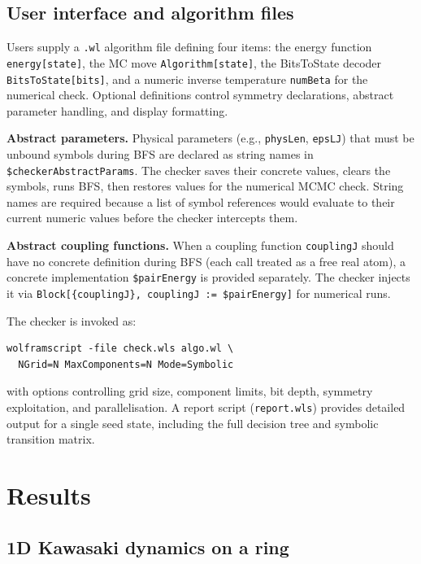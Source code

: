 \documentclass[twocolumn,10pt]{article}
\begin{document}
\subsection{User interface and algorithm files}
\label{sec:interface}

Users supply a \texttt{.wl} algorithm file defining four items: the energy
function \texttt{energy[state]}, the MC move \texttt{Algorithm[state]}, the
BitsToState decoder \texttt{BitsToState[bits]}, and a numeric inverse
temperature \texttt{numBeta} for the numerical check.  Optional definitions
control symmetry declarations, abstract parameter handling, and display
formatting.

\medskip\noindent\textbf{Abstract parameters.}
Physical parameters (e.g., \texttt{physLen}, \texttt{epsLJ}) that must be
unbound symbols during BFS are declared as string names in
\texttt{\$checkerAbstractParams}.  The checker saves their concrete values,
clears the symbols, runs BFS, then restores values for the numerical MCMC
check.  String names are required because a list of symbol references would
evaluate to their current numeric values before the checker intercepts them.

\medskip\noindent\textbf{Abstract coupling functions.}
When a coupling function \texttt{couplingJ} should have no concrete
definition during BFS (each call treated as a free real atom), a concrete
implementation \texttt{\$pairEnergy} is provided separately.  The checker
injects it via \texttt{Block[\{couplingJ\},~couplingJ~:=~\$pairEnergy]}
for numerical runs.

The checker is invoked as:
\begin{lstlisting}
wolframscript -file check.wls algo.wl \
  NGrid=N MaxComponents=N Mode=Symbolic
\end{lstlisting}
with options controlling grid size, component limits, bit depth, symmetry
exploitation, and parallelisation.  A report script (\texttt{report.wls})
provides detailed output for a single seed state, including the full decision
tree and symbolic transition matrix.

\section{Results}
\label{sec:examples}

\subsection{1D Kawasaki dynamics on a ring}
\label{sec:kawasaki}
\end{document}

